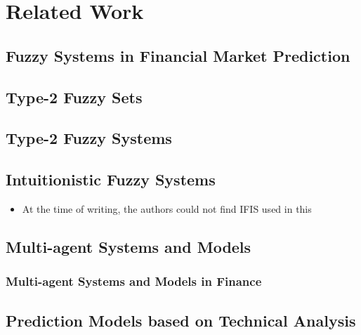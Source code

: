 \chapter{Related Work}
\label{chapter:related-work}

\section{Fuzzy Systems in Financial Market Prediction}
\label{section:fuzzy-systems-in-financial-market-prediction}

\section{Type-2 Fuzzy Sets}
\label{section:type-2-fuzzy-sets:related}

\section{Type-2 Fuzzy Systems}
\label{section:type-2-fuzzy-systems:related}

\section{Intuitionistic Fuzzy Systems}
\label{section:intuitionistic-fuzzy-systems:related}

\begin{itemize}
\item At the time of writing, the authors could not find IFIS used in this
\end{itemize}

\section{Multi-agent Systems and Models}
\label{section:multi-agent-systems-and-models:related}

\subsection{Multi-agent Systems and Models in Finance}
\label{subsection:multi-agent-systems-and-models-in-finance:related}

\section{Prediction Models based on Technical Analysis}
\label{section:prediction-models-based-on-technical-analysis}

